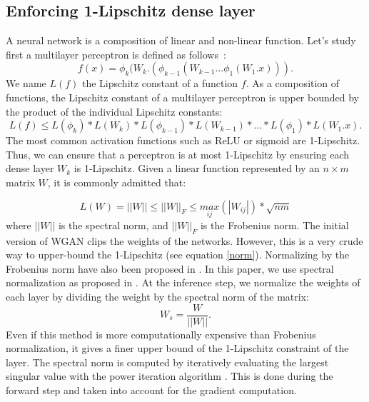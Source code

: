 \subsection{Enforcing 1-Lipschitz dense layer}
A neural network is a composition of linear and non-linear function. Let's study first a multilayer perceptron is defined as follows~:
$$f(x)=\phi_k(W_k.(\phi_{k-1}(W_{k-1}\ldots\phi_1(W_1.x))).$$
We name $L(f)$ the Lipschitz constant of a function $f$. As a composition of functions, the Lipschitz constant of a multilayer perceptron is upper bounded by the product of the individual Lipschitz constants: 
$$L(f)\leq L(\phi_k)*L(W_k)*L(\phi_{k-1})*L(W_{k-1})*\ldots*L(\phi_1)*L(W_1.x).$$
The most common activation functions such as ReLU or sigmoid are 1-Lipschitz. Thus, we can ensure that a perceptron is at most 1-Lipschitz by ensuring each dense layer $W_k$ is 1-Lipschitz. Given a linear function represented by an $n\times m$ matrix $W$, it is commonly admitted that:

\begin{equation}
\label{norm}
    L(W)=||W|| \leq ||W ||_F \leq \underset{ij}{max}(|W_{ij}|)*\sqrt{nm}
\end{equation}
where $|| W||$ is the spectral norm, and  $|| W||_F$ is the Frobenius norm. The initial version of WGAN \cite{Arjovsky2017} clips the weights of the networks. However, this is a very crude way to upper-bound the 1-Lipschitz (see equation \ref{norm}). Normalizing by the Frobenius norm have also been proposed in  \cite{SalimansK16}. In this paper, we use spectral normalization as proposed in \cite{Miyato2018SpectralNF}. At the inference step, we normalize the weights of each layer by dividing the weight by the spectral norm of the matrix:
$$W_s=\frac{W}{||W||}.$$
Even if this method is more computationally expensive than Frobenius normalization, it gives a finer upper bound of the 1-Lipschitz constraint of the layer.
The spectral norm is computed by iteratively evaluating the largest singular value with the power iteration algorithm \cite{GOLUB200035}. This is done during the forward step and taken into account for the gradient computation.



